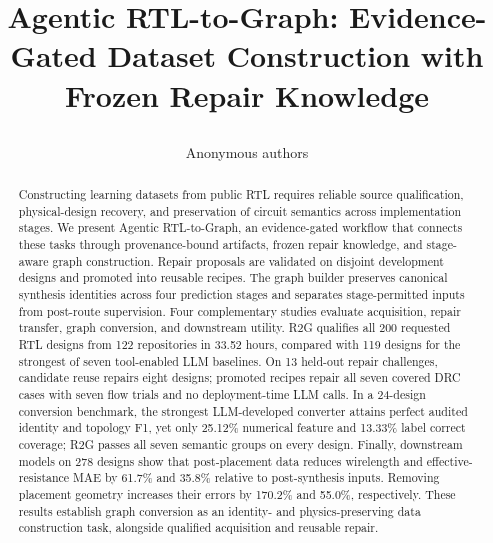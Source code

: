 \documentclass{article}
\title{\raggedright Agentic RTL-to-Graph: Evidence-Gated Dataset Construction with Frozen Repair Knowledge}
\author{Anonymous authors}
\begin{document}
\maketitle
\begin{abstract}
Constructing learning datasets from public RTL requires reliable source qualification, physical-design recovery, and preservation of circuit semantics across implementation stages. We present Agentic RTL-to-Graph, an evidence-gated workflow that connects these tasks through provenance-bound artifacts, frozen repair knowledge, and stage-aware graph construction. Repair proposals are validated on disjoint development designs and promoted into reusable recipes. The graph builder preserves canonical synthesis identities across four prediction stages and separates stage-permitted inputs from post-route supervision. Four complementary studies evaluate acquisition, repair transfer, graph conversion, and downstream utility. R2G qualifies all 200 requested RTL designs from 122 repositories in 33.52 hours, compared with 119 designs for the strongest of seven tool-enabled LLM baselines. On 13 held-out repair challenges, candidate reuse repairs eight designs; promoted recipes repair all seven covered DRC cases with seven flow trials and no deployment-time LLM calls. In a 24-design conversion benchmark, the strongest LLM-developed converter attains perfect audited identity and topology F1, yet only 25.12\% numerical feature and 13.33\% label correct coverage; R2G passes all seven semantic groups on every design. Finally, downstream models on 278 designs show that post-placement data reduces wirelength and effective-resistance MAE by 61.7\% and 35.8\% relative to post-synthesis inputs. Removing placement geometry increases their errors by 170.2\% and 55.0\%, respectively. These results establish graph conversion as an identity- and physics-preserving data construction task, alongside qualified acquisition and reusable repair.
\end{abstract}




\label{sec:main_end}



\appendix



\end{document}
